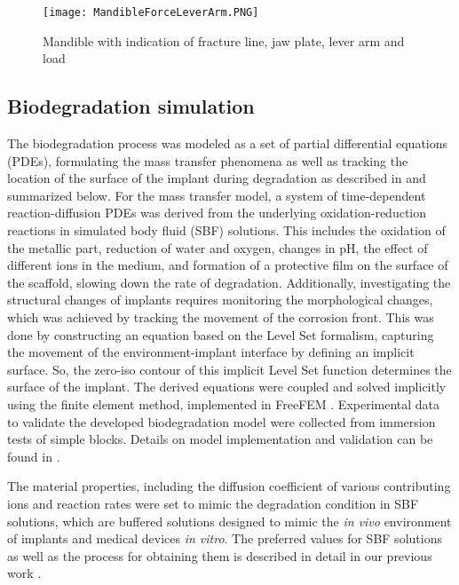 \begin{figure}[h]
    \centering
    \texttt{[image: MandibleForceLeverArm.PNG]}
    \caption{Mandible with indication of fracture line, jaw plate, lever arm and load}
    \label{fig:MandibleForceLeverArm}
\end{figure}


\subsection{Biodegradation simulation}
\label{sec:biodeg}

The biodegradation process was modeled as a set of partial differential equations (PDEs), formulating the mass transfer phenomena as well as tracking the location of the surface of the implant during degradation as described in \cite{Barzegari2021} and summarized below. For the mass transfer model, a system of time-dependent reaction-diffusion PDEs was derived from the underlying oxidation-reduction reactions in simulated body fluid (SBF) solutions. This includes the oxidation of the metallic part, reduction of water and oxygen, changes in pH, the effect of different ions in the medium, and formation of a protective film on the surface of the scaffold, slowing down the rate of degradation. Additionally, investigating the structural changes of implants requires monitoring the morphological changes, which was achieved by tracking the movement of the corrosion front. This was done by constructing an equation based on the Level Set formalism, capturing the movement of the environment-implant interface by defining an implicit surface. So, the zero-iso contour of this implicit Level Set function determines the surface of the implant. The derived equations were coupled and solved implicitly using the finite element method, implemented in FreeFEM \cite{Hecht2012}. Experimental data to validate the developed biodegradation model were collected from immersion tests of simple blocks. Details on model implementation and validation can be found in \cite{Barzegari2021}.

The material properties, including the diffusion coefficient of various contributing ions and reaction rates were set to mimic the degradation condition in SBF solutions, which are buffered solutions designed to mimic the \textit{in vivo} environment of implants and medical devices \textit{in vitro}. The preferred values for SBF solutions as well as the process for obtaining them is described in detail in our previous work \cite{Barzegari2021}. 

